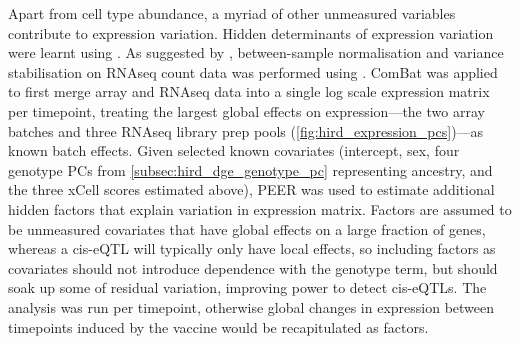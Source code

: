 %
%
Apart from cell type abundance, a myriad of other unmeasured variables contribute to expression variation.
Hidden determinants of expression variation were learnt using \autocite{stegle2012UsingProbabilisticEstimation}.
As suggested by \autocite{stegle2012UsingProbabilisticEstimation}, between-sample normalisation and variance stabilisation on \gls{RNAseq} count data was performed using .
ComBat was applied to first merge array and \gls{RNAseq} data into a single log scale expression matrix per timepoint, treating the largest global effects on expression---the two array batches and three \gls{RNAseq} library prep pools (\cref{fig:hird_expression_pcs})---as known batch effects.
Given selected known covariates (intercept, sex, four genotype \glspl{PC} from \cref{subsec:hird_dge_genotype_pc} representing ancestry, and the three xCell scores estimated above),
PEER was used to estimate additional hidden factors that explain variation in expression matrix.
Factors are assumed to be unmeasured covariates that have global effects on a large fraction of genes, 
whereas a cis-\gls{eQTL} will typically only have local effects, so including factors as covariates should not introduce dependence with the genotype term,
but should soak up some of residual variation, improving power to detect cis-\glspl{eQTL}.
The analysis was run per timepoint, otherwise global changes in expression between timepoints induced by the vaccine would be recapitulated as factors.

